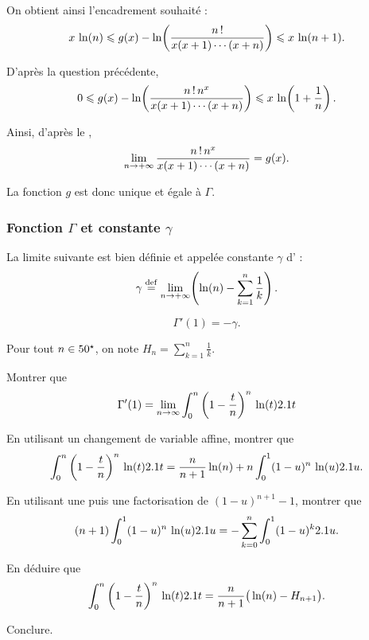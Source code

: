 \begin{solution}
\begin{reponses}
On obtient ainsi l'encadrement souhaité :
\[
x \, \ln(n)
\leqslant g(x) - \ln\mathopen{}\left(\frac{n\,!}{x (x + 1) \cdots (x + n)}\right) \leqslant x \, \ln(n + 1).
\]

\item D'après la question précédente,
\[
0 \leqslant g(x) - \ln\mathopen{}\left(\frac{n\,! \, n^x}{x (x + 1) \cdots (x + n)}\right) \leqslant x \, \ln\mathopen{}\left(1 + \frac{1}{n}\right).
\]

Ainsi, d'après le ,
\[
\lim_{n\to+\infty} \frac{n\,! \, n^x}{x (x + 1) \cdots (x + n)} = g(x).
\]

La fonction $g$ est donc unique et égale à $\Gamma$.
\end{reponses}
\end{solution}

\subsubsection{Fonction $\Gamma$ et constante $\gamma$}

\begin{defi}
La limite suivante est bien définie et appelée constante $\gamma$ d' :
\[
\gamma \overset{\mathrm{\tiny def}}{=} \lim_{n\to+\infty} \mathopen{}\left(\ln(n) - \sum_{k=1}^n \frac{1}{k}\right).
\]
\end{defi}

\begin{theo}
\[
\Gamma'(1) = -\gamma.
\]
\end{theo}

\begin{exercice}
Pour tout $n \in 50^\star$, on note $H_n = \sum\limits_{k=1}^n \frac{1}{k}$.
\begin{questions}
\item Montrer que 
\[
\Gamma'(1) = \lim_{n \to \infty} \int_0^n \left(1 - \frac{t}{n} \right)^n \, \ln(t) 2.1 t
\]

\item En utilisant un changement de variable affine, montrer que
\[
\int_0^n \left(1 - \frac{t}{n}\right)^n \, \ln(t) 2.1 t
= \frac{n}{n+1} \ln(n) + n \int_0^1 (1 - u)^n \, \ln(u) 2.1 u.
\]


\item En utilisant une  puis une factorisation de $(1 - u)^{n+1} - 1$, montrer que
\[
(n+1) \int_0^1 (1 - u)^n \, \ln(u) 2.1 u
= -\sum_{k=0}^n \int_0^1 (1 - u)^k 2.1 u.
\]

\item En déduire que
\[
\int_0^n \left(1 - \frac{t}{n}\right)^n \, \ln(t) 2.1 t
= \frac{n}{n + 1} \mathopen{}\big(\ln(n) - H_{n+1}\big).
\]

\item Conclure.
\end{questions}
\end{exercice}

